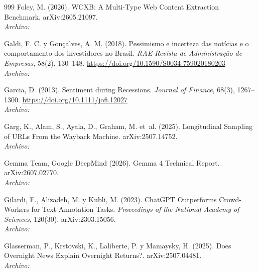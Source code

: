 \begin{thebibliography}{999}
Foley, M. (2026). {WCXB}: A Multi-Type Web Content Extraction Benchmark. arXiv:2605.21097.
\\\textit{Archivo:} 

Galdi, F. C. y Gon{\c{c}}alves, A. M. (2018). Pessimismo e incerteza das not{\'i}cias e o comportamento dos investidores no {Brasil}. \emph{RAE-Revista de Administra{\c{c}}{\~a}o de Empresas}, 58(2), 130--148. \url{https://doi.org/10.1590/S0034-759020180203}
\\\textit{Archivo:} 

Garcia, D. (2013). Sentiment during Recessions. \emph{Journal of Finance}, 68(3), 1267--1300. \url{https://doi.org/10.1111/jofi.12027}
\\\textit{Archivo:} 

Garg, K., Alam, S., Ayala, D., Graham, M. et~al. (2025). Longitudinal Sampling of {URLs} From the {Wayback Machine}. arXiv:2507.14752.
\\\textit{Archivo:} 

Gemma Team, Google DeepMind (2026). Gemma 4 Technical Report. arXiv:2607.02770.
\\\textit{Archivo:} 

Gilardi, F., Alizadeh, M. y Kubli, M. (2023). {ChatGPT} Outperforms Crowd-Workers for Text-Annotation Tasks. \emph{Proceedings of the National Academy of Sciences}, 120(30). arXiv:2303.15056.
\\\textit{Archivo:} 

Glasserman, P., Krstovski, K., Laliberte, P. y Mamaysky, H. (2025). Does Overnight News Explain Overnight Returns?. arXiv:2507.04481.
\\\textit{Archivo:} 


\end{thebibliography}
